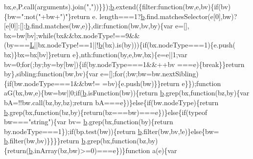 \begin{DoxyCode}
      bx,e,P.call(arguments).join(\textcolor{stringliteral}{","}))\}\});\hyperlink{a00039_aa4026ad5544b958e54ce5e106fa1c805}{b}.extend(\{filter:\textcolor{keyword}{function}(bw,e,bv)\{\textcolor{keywordflow}{if}(bv)\{bw=\textcolor{stringliteral}{":not("}+bw+\textcolor{stringliteral}{")"}\}\textcolor{keywordflow}{return} e.
      length===1?\hyperlink{a00039_aa4026ad5544b958e54ce5e106fa1c805}{b}.find.matchesSelector(e[0],bw)?[e[0]]:[]:\hyperlink{a00039_aa4026ad5544b958e54ce5e106fa1c805}{b}.find.matches(bw,e)\},dir:\textcolor{keyword}{function}(bw,bv,by)\{var e=[],
      bx=bw[bv];\textcolor{keywordflow}{while}(bx&&bx.nodeType!==9&&(by===\hyperlink{a00039_a38ee4c0b5f4fe2a18d0c783af540d253}{L}||bx.nodeType!==1||!\hyperlink{a00039_aa4026ad5544b958e54ce5e106fa1c805}{b}(bx).is(by)))\{\textcolor{keywordflow}{if}(bx.nodeType===1)\{e.push(
      bx)\}bx=bx[bv]\}\textcolor{keywordflow}{return} e\},nth:\textcolor{keyword}{function}(by,e,bw,bx)\{e=e||1;var bv=0;\textcolor{keywordflow}{for}(;by;by=by[bw])\{\textcolor{keywordflow}{if}(by.nodeType===1&&++bv
      ===e)\{\textcolor{keywordflow}{break}\}\}\textcolor{keywordflow}{return} by\},sibling:\textcolor{keyword}{function}(bw,bv)\{var e=[];\textcolor{keywordflow}{for}(;bw;bw=bw.nextSibling)\{\textcolor{keywordflow}{if}(bw.nodeType===1&&bw!=
      =bv)\{e.push(bw)\}\}\textcolor{keywordflow}{return} e\}\});\textcolor{keyword}{function} aG(bx,bw,e)\{bw=bw||0;\textcolor{keywordflow}{if}(\hyperlink{a00039_aa4026ad5544b958e54ce5e106fa1c805}{b}.isFunction(bw))\{\textcolor{keywordflow}{return} 
      \hyperlink{a00039_aa4026ad5544b958e54ce5e106fa1c805}{b}.grep(bx,\textcolor{keyword}{function}(bz,by)\{var bA=!!bw.call(bz,by,bz);\textcolor{keywordflow}{return} bA===e\})\}\textcolor{keywordflow}{else}\{\textcolor{keywordflow}{if}(bw.nodeType)\{\textcolor{keywordflow}{return} 
      \hyperlink{a00039_aa4026ad5544b958e54ce5e106fa1c805}{b}.grep(bx,\textcolor{keyword}{function}(bz,by)\{\textcolor{keywordflow}{return}(bz===bw)===e\})\}\textcolor{keywordflow}{else}\{\textcolor{keywordflow}{if}(typeof bw===\textcolor{stringliteral}{"string"})\{var bv=
      \hyperlink{a00039_aa4026ad5544b958e54ce5e106fa1c805}{b}.grep(bx,\textcolor{keyword}{function}(by)\{\textcolor{keywordflow}{return} by.nodeType===1\});\textcolor{keywordflow}{if}(bp.test(bw))\{\textcolor{keywordflow}{return} \hyperlink{a00039_aa4026ad5544b958e54ce5e106fa1c805}{b}.filter(bw,bv,!e)\}\textcolor{keywordflow}{else}\{bw=
      \hyperlink{a00039_aa4026ad5544b958e54ce5e106fa1c805}{b}.filter(bw,bv)\}\}\}\}\textcolor{keywordflow}{return} \hyperlink{a00039_aa4026ad5544b958e54ce5e106fa1c805}{b}.grep(bx,\textcolor{keyword}{function}(bz,by)\{\textcolor{keywordflow}{return}(\hyperlink{a00039_aa4026ad5544b958e54ce5e106fa1c805}{b}.inArray(bz,bw)>=0)===e\})\}\textcolor{keyword}{function} a(e)\{var 

\end{DoxyCode}
